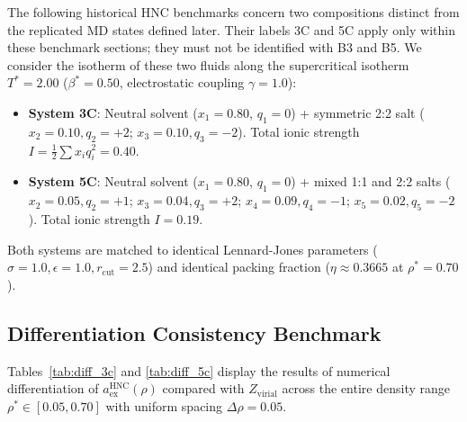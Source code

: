 \documentclass[11pt,a4paper]{article}
\begin{document}
The following historical HNC benchmarks concern two compositions distinct from the replicated MD states defined later. Their labels 3C and 5C apply only within these benchmark sections; they must not be identified with B3 and B5. We consider the isotherm of these two fluids along the supercritical isotherm $T^* = 2.00$ ($\beta^* = 0.50$, electrostatic coupling $\gamma = 1.0$):
\begin{itemize}
    \item \textbf{System 3C}: Neutral solvent ($x_1 = 0.80$, $q_1 = 0$) + symmetric 2:2 salt ($x_2 = 0.10, q_2 = +2$; $x_3 = 0.10, q_3 = -2$). Total ionic strength $I = \frac{1}{2}\sum x_i q_i^2 = 0.40$.
    \item \textbf{System 5C}: Neutral solvent ($x_1 = 0.80$, $q_1 = 0$) + mixed 1:1 and 2:2 salts ($x_2 = 0.05, q_2 = +1$; $x_3 = 0.04, q_3 = +2$; $x_4 = 0.09, q_4 = -1$; $x_5 = 0.02, q_5 = -2$). Total ionic strength $I = 0.19$.
\end{itemize}
Both systems are matched to identical Lennard-Jones parameters ($\sigma = 1.0, \epsilon = 1.0, r_{\text{cut}} = 2.5$) and identical packing fraction ($\eta \approx 0.3665$ at $\rho^* = 0.70$).

\subsection{Differentiation Consistency Benchmark}

Tables~\ref{tab:diff_3c} and \ref{tab:diff_5c} display the results of numerical differentiation of $a_{\text{ex}}^{\text{HNC}}(\rho)$ compared with $Z_{\text{virial}}$ across the entire density range $\rho^* \in [0.05, 0.70]$ with uniform spacing $\Delta\rho = 0.05$.
\end{document}
